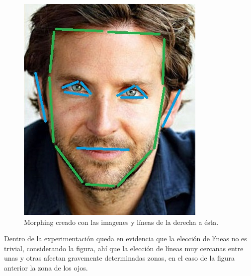 \documentclass[conference]{IEEEtran}
\begin{document}
\begin{figure}[H]
\begin{multicols}{3}
    \includegraphics[width=0.65\linewidth]{errors/01/2 lines.jpg} \par
   
\end{multicols}
\caption{Morphing creado con las imagenes y líneas de la derecha a ésta.}
\end{figure}	
	
	Dentro de la experimentación queda en evidencia que la elección de líneas no es trivial, considerando la figura, ahí que la elección de líneas muy cercanas entre unas y otras afectan gravemente determinadas zonas, en el caso de la figura anterior la zona de los ojos.
		
\end{document}
